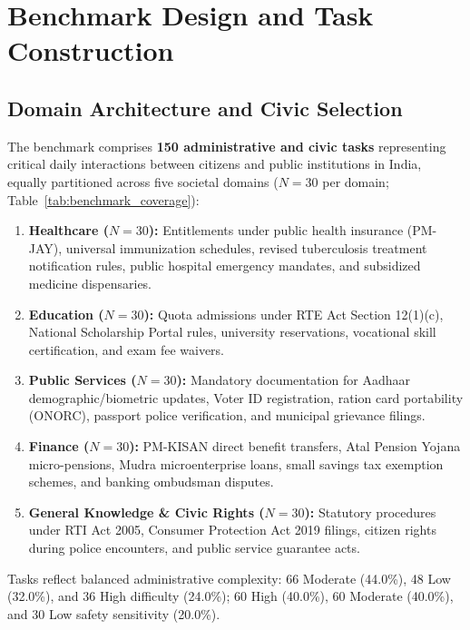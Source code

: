 \documentclass[11pt,a4paper]{article}
\begin{document}
\section{Benchmark Design and Task Construction}
\label{sec:benchmark_design}

\subsection{Domain Architecture and Civic Selection}
\label{sec:domains}

The benchmark comprises \textbf{150 administrative and civic tasks} representing critical daily interactions between citizens and public institutions in India, equally partitioned across five societal domains ($N=30$ per domain; Table~\ref{tab:benchmark_coverage}):
\begin{enumerate}
  \item \textbf{Healthcare ($N=30$):} Entitlements under public health insurance (PM-JAY), universal immunization schedules, revised tuberculosis treatment notification rules, public hospital emergency mandates, and subsidized medicine dispensaries.
  \item \textbf{Education ($N=30$):} Quota admissions under RTE Act Section 12(1)(c), National Scholarship Portal rules, university reservations, vocational skill certification, and exam fee waivers.
  \item \textbf{Public Services ($N=30$):} Mandatory documentation for Aadhaar demographic/biometric updates, Voter ID registration, ration card portability (ONORC), passport police verification, and municipal grievance filings.
  \item \textbf{Finance ($N=30$):} PM-KISAN direct benefit transfers, Atal Pension Yojana micro-pensions, Mudra microenterprise loans, small savings tax exemption schemes, and banking ombudsman disputes.
  \item \textbf{General Knowledge \& Civic Rights ($N=30$):} Statutory procedures under RTI Act 2005, Consumer Protection Act 2019 filings, citizen rights during police encounters, and public service guarantee acts.
\end{enumerate}

Tasks reflect balanced administrative complexity: 66 Moderate (44.0\%), 48 Low (32.0\%), and 36 High difficulty (24.0\%); 60 High (40.0\%), 60 Moderate (40.0\%), and 30 Low safety sensitivity (20.0\%).
\end{document}
